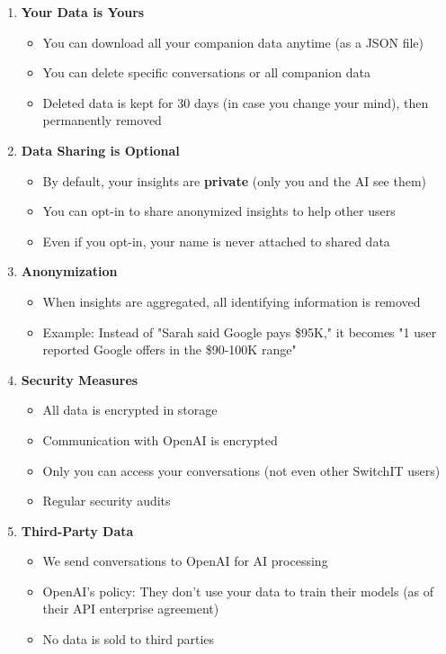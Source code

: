 \documentclass[12pt,a4paper]{article}
\begin{document}
\begin{enumerate}
  \item \textbf{Your Data is Yours}
  \begin{itemize}
    \item You can download all your companion data anytime (as a JSON file)
    \item You can delete specific conversations or all companion data
    \item Deleted data is kept for 30 days (in case you change your mind), then permanently removed
  \end{itemize}

  \item \textbf{Data Sharing is Optional}
  \begin{itemize}
    \item By default, your insights are \textbf{private} (only you and the AI see them)
    \item You can opt-in to share anonymized insights to help other users
    \item Even if you opt-in, your name is never attached to shared data
  \end{itemize}

  \item \textbf{Anonymization}
  \begin{itemize}
    \item When insights are aggregated, all identifying information is removed
    \item Example: Instead of "Sarah said Google pays \$95K," it becomes "1 user reported Google offers in the \$90-100K range"
  \end{itemize}

  \item \textbf{Security Measures}
  \begin{itemize}
    \item All data is encrypted in storage
    \item Communication with OpenAI is encrypted
    \item Only you can access your conversations (not even other SwitchIT users)
    \item Regular security audits
  \end{itemize}

  \item \textbf{Third-Party Data}
  \begin{itemize}
    \item We send conversations to OpenAI for AI processing
    \item OpenAI's policy: They don't use your data to train their models (as of their API enterprise agreement)
    \item No data is sold to third parties
  \end{itemize}
\end{enumerate}
\end{document}
